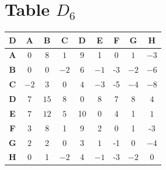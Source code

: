 \documentclass{article}
\begin{document}
\section{Table $D_{6}$}
\begin{center}
    \begin{tabular}{|c||c|c|c|c|c|c|c|c|}
        \hline
        \textbf{D} & \textbf{A} & \textbf{B} & \textbf{C} & \textbf{D} & \textbf{E} & \textbf{F} & \textbf{G} & \textbf{H} \\
        \hline
        \hline
        \textbf{A}& 0 & \cellcolor[HTML]{D74894}$8$ & \cellcolor[HTML]{D74894}$1$ & \cellcolor[HTML]{D74894}$9$ & 1 & 0 & \cellcolor[HTML]{D74894}$1$ & \cellcolor[HTML]{D74894}$-3$ \\
        \hline
        \textbf{B}& \cellcolor[HTML]{D74894}$0$ & 0 & \cellcolor[HTML]{D74894}$-2$ & \cellcolor[HTML]{D74894}$6$ & \cellcolor[HTML]{D74894}$-1$ & -3 & \cellcolor[HTML]{D74894}$-2$ & \cellcolor[HTML]{D74894}$-6$ \\
        \hline
        \textbf{C}& \cellcolor[HTML]{D74894}$-2$ & \cellcolor[HTML]{D74894}$3$ & 0 & \cellcolor[HTML]{D74894}$4$ & \cellcolor[HTML]{D74894}$-3$ & -5 & \cellcolor[HTML]{D74894}$-4$ & \cellcolor[HTML]{D74894}$-8$ \\
        \hline
        \textbf{D}& 7 & \cellcolor[HTML]{D74894}$15$ & \cellcolor[HTML]{D74894}$8$ & 0 & 8 & 7 & 8 & \cellcolor[HTML]{D74894}$4$ \\
        \hline
        \textbf{E}& \cellcolor[HTML]{D74894}$7$ & \cellcolor[HTML]{D74894}$12$ & \cellcolor[HTML]{D74894}$5$ & 10 & 0 & 4 & 1 & \cellcolor[HTML]{D74894}$1$ \\
        \hline
        \textbf{F}& 3 & 8 & 1 & 9 & 2 & 0 & 1 & -3 \\
        \hline
        \textbf{G}& \cellcolor[HTML]{D74894}$2$ & 2 & \cellcolor[HTML]{D74894}$0$ & 3 & \cellcolor[HTML]{D74894}$1$ & -1 & 0 & \cellcolor[HTML]{D74894}$-4$ \\
        \hline
        \textbf{H}& \cellcolor[HTML]{D74894}$0$ & 1 & \cellcolor[HTML]{D74894}$-2$ & 4 & \cellcolor[HTML]{D74894}$-1$ & -3 & \cellcolor[HTML]{D74894}$-2$ & 0 \\
        \hline
    \end{tabular}
\end{center}
\end{document}
